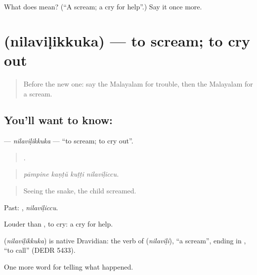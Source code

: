 \begin{tcolorbox}[breakable,colback=teal!4,colframe=teal!35!black,title={Before you move on}]
What does  mean? (\textquotedblleft{}A scream; a cry for help\textquotedblright{}.) Say it once more.
\end{tcolorbox}
\section[\texorpdfstring{\ml{നിലവിളിക്കുക} (nilaviḷikkuka)}{നിലവിളിക്കുക (nilaviḷikkuka)}]{ (nilaviḷikkuka) — to scream; to cry out}

\label{lesson:ML-C380-nilavilikkuka}



\begin{quote}
Before the new one: say the Malayalam for trouble, then the Malayalam for a scream.
\end{quote}

\subsection*{You'll want to know: }
\textbf{} — \emph{nilaviḷikkuka} — \textquotedblleft{}to scream; to cry out\textquotedblright{}.

\begin{quote}
   .
\end{quote}

\begin{quote}
\emph{pāmpine kaṇṭŭ kuṭṭi nilaviḷiccu.}
\end{quote}

\begin{quote}
Seeing the snake, the child screamed.
\end{quote}

Past: , \emph{nilaviḷiccu}.

Louder than , to cry: a cry for help.

\begin{cousinweb}
\textbf{} (\emph{nilaviḷikkuka}) is native Dravidian: the verb of  (\emph{nilaviḷi}), \textquotedblleft{}a scream\textquotedblright{}, ending in , \textquotedblleft{}to call\textquotedblright{} (DEDR 5433).
\end{cousinweb}

\begin{grammarlens}[title={What you've built}]
One more word for telling what happened.
\end{grammarlens}

